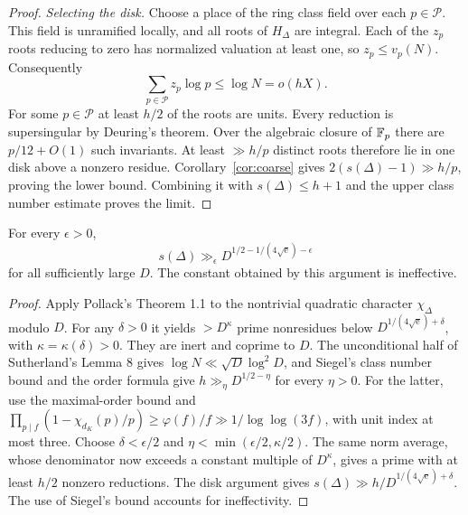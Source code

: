 \begin{proof}
\emph{Selecting the disk.}
Choose a place of the ring class field over each $p\in\mathcal P$. This field is unramified locally, and all roots of $H_\Delta$ are integral. Each of the $z_p$ roots reducing to zero has normalized valuation at least one, so $z_p\le v_p(N)$. Consequently
\[
 \sum_{p\in\mathcal P} z_p\log p\le\log N
       =o(hX).
\]
For some $p\in\mathcal P$ at least $h/2$ of the roots are units. Every reduction is supersingular by Deuring's theorem. Over the algebraic closure of $\mathbb F_p$ there are $p/12+O(1)$ such invariants. At least $\gg h/p$ distinct roots therefore lie in one disk above a nonzero residue. Corollary~\ref{cor:coarse} gives $2(s(\Delta)-1)\gg h/p$, proving the lower bound. Combining it with $s(\Delta)\le h+1$ and the upper class number estimate proves the limit.\cite{cmred,supersing}
\end{proof}

\begin{corollary}\label{cor:pollack}
For every $\epsilon>0$,
\[
 s(\Delta)\gg_\epsilon D^{1/2-1/(4\sqrt{\mathrm e})-\epsilon}
\]
for all sufficiently large $D$. The constant obtained by this argument is ineffective.
\end{corollary}
\begin{proof}
Apply Pollack's Theorem 1.1 to the nontrivial quadratic character $\chi_\Delta$ modulo $D$. For any $\delta>0$ it yields $>D^\kappa$ prime nonresidues below $D^{1/(4\sqrt{\mathrm e})+\delta}$, with $\kappa=\kappa(\delta)>0$. They are inert and coprime to $D$. The unconditional half of Sutherland's Lemma 8 gives $\log N\ll\sqrt D\log^2D$, and Siegel's class number bound and the order formula give $h\gg_\eta D^{1/2-\eta}$ for every $\eta>0$. For the latter, use the maximal-order bound and $\prod_{p\mid f}(1-\chi_{d_K}(p)/p)\ge\varphi(f)/f\gg1/\log\log(3f)$, with unit index at most three. Choose $\delta<\epsilon/2$ and $\eta<\min(\epsilon/2,\kappa/2)$. The same norm average, whose denominator now exceeds a constant multiple of $D^\kappa$, gives a prime with at least $h/2$ nonzero reductions. The disk argument gives $s(\Delta)\gg h/D^{1/(4\sqrt{\mathrm e})+\delta}$. The use of Siegel's bound accounts for ineffectivity.\cite{pollack,suth}
\end{proof}
